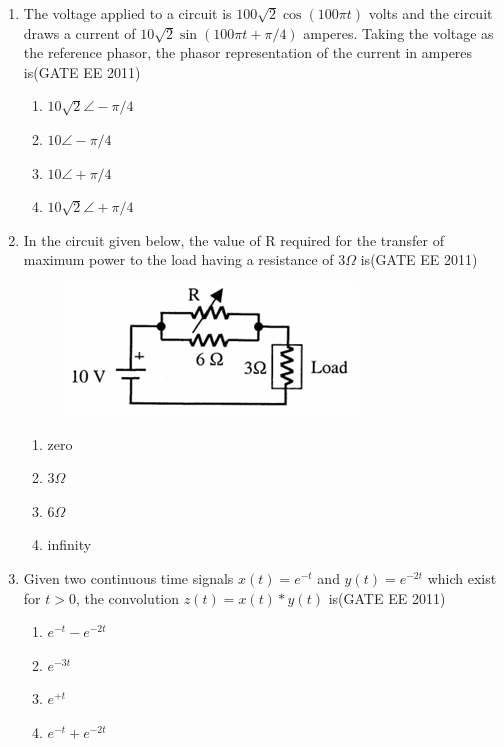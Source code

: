 \documentclass[a4paper,10pt]{exam}
\theoremstyle{remark}
\begin{document}
\begin{enumerate}
\noindent\rule{\textwidth}{0.4pt}

\item The voltage applied to a circuit is $100\sqrt{2}\cos(100\pi t)$ volts and the circuit draws a current of $10\sqrt{2}\sin(100\pi t + \pi/4)$ amperes. Taking the voltage as the reference phasor, the phasor representation of the current in amperes is\hfill{(GATE EE 2011)}
\begin{multicols}{4}
\begin{enumerate}
    \item $10\sqrt{2} \angle -\pi/4$
    \item $10 \angle -\pi/4$
    \item $10 \angle +\pi/4$
    \item $10\sqrt{2} \angle +\pi/4$
\end{enumerate}
\end{multicols}

\item In the circuit given below, the value of R required for the transfer of maximum power to the load having a resistance of $3\Omega$ is\hfill{(GATE EE 2011)}
\begin{figure}[H]
    \centering
    \includegraphics[width=0.5\columnwidth]{figs/Q 16.png}\caption{}     \label{fig:myfigure}
\end{figure}
\begin{multicols}{4}
\begin{enumerate}
    \item zero
    \item $3\Omega$ 
    \item  $6\Omega$
    \item infinity
\end{enumerate}
\end{multicols}

\item Given two continuous time signals $x(t) = e^{-t}$ and $y(t) = e^{-2t}$ which exist for $t > 0$, the convolution $z(t) = x(t) * y(t)$ is\hfill{(GATE EE 2011)}

\vspace{1em}

\begin{multicols}{4}
\begin{enumerate}
    \item $e^{-t} - e^{-2t}$
    \item $e^{-3t}$
    \item $e^{+t}$
    \item $e^{-t} + e^{-2t}$
\end{enumerate}
\end{multicols}


\end{enumerate}
\end{document}
